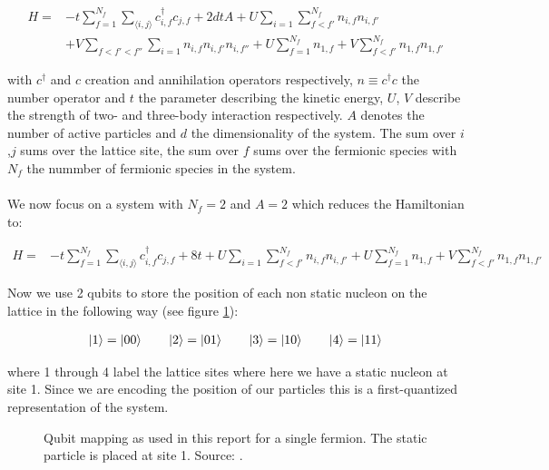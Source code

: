 \documentclass[10 pt, a4paper]{article}
\begin{document}
\begin{align} \label{eqn:ham}
H =& -t \sum_{f = 1}^{N_f} \sum_{\langle i,j \rangle} c_{i,f}^\dagger c_{j,f} + 2 d t A + U \sum_{i = 1} \sum_{f<f'}^{N_f} n_{i,f} n_{i,f'} \nonumber \\ 
&+ V \sum_{f<f'<f''} \sum_{i = 1} n_{i,f} n_{i,f'} n_{i,f''} + U \sum_{f = 1}^{N_f} n_{1,f} + V \sum_{f<f'}^{N_f} n_{1,f} n_{1,f'}
\end{align}

with $c^\dagger$ and $c$ creation and annihilation operators respectively, $n \equiv c^\dagger c$ the number operator and $t$ the parameter describing the kinetic energy, $U$, $V$ describe the strength of two- and three-body interaction respectively. $A$ denotes the number of active particles and $d$ the dimensionality of the system. The sum over $i$,$j$ sums over the lattice site, the sum over $f$ sums over the fermionic species with $N_f$ the nummber of fermionic species in the system. 
\\
\\
We now focus on a system with $N_f = 2$ and $A = 2$ which reduces the Hamiltonian to:

\begin{align*}
H =& -t \sum_{f = 1}^{N_f} \sum_{\langle i,j \rangle} c_{i,f}^\dagger c_{j,f} + 8 t  + U \sum_{i = 1} \sum_{f<f'}^{N_f} n_{i,f} n_{i,f'}  + U \sum_{f = 1}^{N_f} n_{1,f} + V \sum_{f<f'}^{N_f} n_{1,f} n_{1,f'}
\end{align*}

Now we use 2 qubits to store the position of each non static nucleon on the lattice in the following way (see figure \ref{fig:qubitmapping}):

\begin{align*}
\ket{1} = \ket{00}  \qquad \ket{2} = \ket{01} \qquad \ket{3} = \ket{10} \qquad \ket{4} = \ket{11}
\end{align*}

where 1 through 4 label the lattice sites where here we have a static nucleon at site 1. Since we are encoding the position of our particles this is a first-quantized representation of the system.


\begin{figure}[H]
\centering
\caption{Qubit mapping as used in this report for a single fermion. The static particle is placed at site 1. Source: \cite{neutscat}.}
\label{fig:qubitmapping}
\end{figure}
\end{document}
